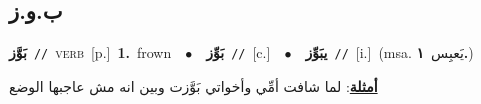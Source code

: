 \documentclass[10pt,a4paper,twoside]{article} %
\begin{document}
\begin{multicols}{2}
\vspace{-3mm}
\subsection*{\color{blue}\foreignlanguage{arabic}{ب.و.ز}\color{blue}{}} 

{\setlength\topsep{0pt}\textbf{\foreignlanguage{arabic}{بَوَّز}}\ {\color{gray}\texttt{//}\color{black}}\ \textsc{verb}\ [p.]\ \textbf{1.}~frown\ \ $\bullet$\ \ \setlength\topsep{0pt}\textbf{\foreignlanguage{arabic}{بَوِّز}}\ {\color{gray}\texttt{//}\color{black}}\ [c.]\ \ $\bullet$\ \ \setlength\topsep{0pt}\textbf{\foreignlanguage{arabic}{يبَوِّز}}\ {\color{gray}\texttt{//}\color{black}}\ [i.]\ \color{gray}(msa. \foreignlanguage{arabic}{يَعبِس}~\foreignlanguage{arabic}{\textbf{١.}})\color{black}\  \begin{flushright}\color{gray}\foreignlanguage{arabic}{\textbf{\underline{\foreignlanguage{arabic}{أمثلة}}}: لما شافت أمِّي وأخواتي بَوَّزت وبين انه مش عاجبها الوضع}\end{flushright}\color{black}} \vspace{2mm}


\end{multicols}
\end{document}
